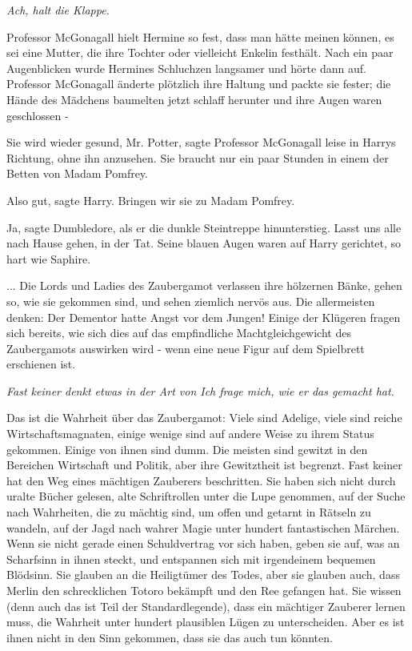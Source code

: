 \emph{Ach, halt die Klappe.}

Professor McGonagall hielt Hermine so fest, dass man hätte meinen können, es sei
eine Mutter, die ihre Tochter oder vielleicht Enkelin festhält. Nach ein paar
Augenblicken wurde Hermines Schluchzen langsamer und hörte dann auf. Professor
McGonagall änderte plötzlich ihre Haltung und packte sie fester; die Hände des
Mädchens baumelten jetzt schlaff herunter und ihre Augen waren geschlossen -

\glqq Sie wird wieder gesund, Mr. Potter\grqq{}, sagte Professor McGonagall
leise in Harrys Richtung, ohne ihn anzusehen. \glqq Sie braucht nur ein paar
Stunden in einem der Betten von Madam Pomfrey.\grqq{}

\glqq Also gut\grqq{}, sagte Harry. \glqq Bringen wir sie zu Madam
Pomfrey.\grqq{}

\glqq Ja\grqq{}, sagte Dumbledore, als er die dunkle Steintreppe hinunterstieg.
\glqq Lasst uns alle nach Hause gehen, in der Tat.\grqq{} Seine blauen Augen
waren auf Harry gerichtet, so hart wie Saphire.

... Die Lords und Ladies des Zaubergamot verlassen ihre hölzernen Bänke, gehen
so, wie sie gekommen sind, und sehen ziemlich nervös aus. Die allermeisten
denken: \glqq Der Dementor hatte Angst vor dem Jungen!\grqq{} Einige der
Klügeren fragen sich bereits, wie sich dies auf das empfindliche
Machtgleichgewicht des Zaubergamots auswirken wird - wenn eine neue Figur auf
dem Spielbrett erschienen ist.

\emph{Fast keiner denkt etwas in der Art von \glqq Ich frage mich, wie er das
gemacht hat.\grqq{}}

Das ist die Wahrheit über das Zaubergamot: Viele sind Adelige, viele sind reiche
Wirtschaftsmagnaten, einige wenige sind auf andere Weise zu ihrem Status
gekommen. Einige von ihnen sind dumm. Die meisten sind gewitzt in den Bereichen
Wirtschaft und Politik, aber ihre Gewitztheit ist begrenzt. Fast keiner hat den
Weg eines mächtigen Zauberers beschritten. Sie haben sich nicht durch uralte
Bücher gelesen, alte Schriftrollen unter die Lupe genommen, auf der Suche nach
Wahrheiten, die zu mächtig sind, um offen und getarnt in Rätseln zu wandeln, auf
der Jagd nach wahrer Magie unter hundert fantastischen Märchen. Wenn sie nicht
gerade einen Schuldvertrag vor sich haben, geben sie auf, was an Scharfsinn in
ihnen steckt, und entspannen sich mit irgendeinem bequemen Blödsinn. Sie glauben
an die Heiligtümer des Todes, aber sie glauben auch, dass Merlin den
schrecklichen Totoro bekämpft und den Ree gefangen hat. Sie wissen (denn auch
das ist Teil der Standardlegende), dass ein mächtiger Zauberer lernen muss, die
Wahrheit unter hundert plausiblen Lügen zu unterscheiden. Aber es ist ihnen
nicht in den Sinn gekommen, dass sie das auch tun könnten.

